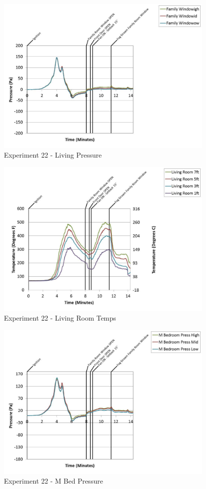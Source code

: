 \documentclass{article}
\begin{document}
\begin{appendices}
	\clearpage

	\begin{figure}[h!]
		\centering
		\includegraphics[height=3.05in]{0_Images/Results_Charts/Exp_22_Charts/LivingPressure.pdf}
		\caption{Experiment 22 - Living Pressure}
	\end{figure}
 

	\begin{figure}[h!]
		\centering
		\includegraphics[height=3.05in]{0_Images/Results_Charts/Exp_22_Charts/LivingRoomTemps.pdf}
		\caption{Experiment 22 - Living Room Temps}
	\end{figure}
 
	\clearpage

	\begin{figure}[h!]
		\centering
		\includegraphics[height=3.05in]{0_Images/Results_Charts/Exp_22_Charts/MBedPressure.pdf}
		\caption{Experiment 22 - M Bed Pressure}
	\end{figure}
 


\end{appendices}
\end{document}
